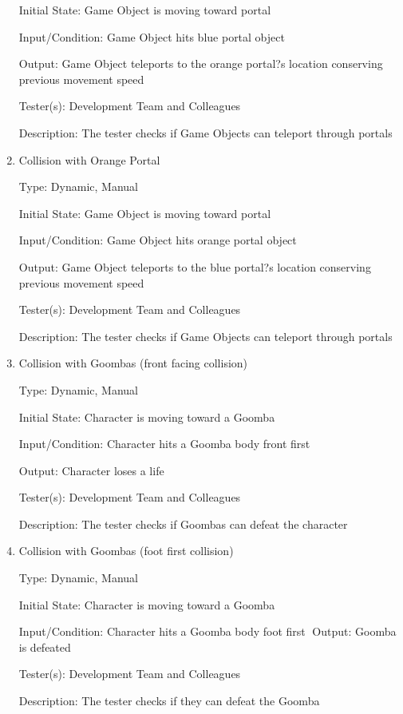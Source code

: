 \documentclass[12pt, titlepage]{article}
\begin{document}
\begin{enumerate}
Initial State: Game Object is moving toward portal

Input/Condition: Game Object hits blue portal object

Output: Game Object teleports to the orange portal?s location conserving previous movement speed

Tester(s): Development Team and Colleagues

Description: The tester checks if Game Objects can teleport through portals


\item{Collision with Orange Portal\\}

Type: Dynamic, Manual

Initial State: Game Object is moving toward portal

Input/Condition: Game Object hits orange portal object

Output: Game Object teleports to the blue portal?s location conserving previous movement speed

Tester(s): Development Team and Colleagues

Description: The tester checks if Game Objects can teleport through portals


\item{Collision with Goombas (front facing collision)\\}

Type: Dynamic, Manual

Initial State: Character is moving toward a Goomba

Input/Condition: Character hits a Goomba body front first

Output: Character loses a life

Tester(s): Development Team and Colleagues

Description: The tester checks if Goombas can defeat the character


\item{Collision with Goombas (foot first collision)\\}

Type: Dynamic, Manual

Initial State: Character is moving toward a Goomba

Input/Condition: Character hits a Goomba body foot first
Output: Goomba is defeated

Tester(s): Development Team and Colleagues

Description: The tester checks if they can defeat the Goomba

\end{enumerate}
\end{document}
